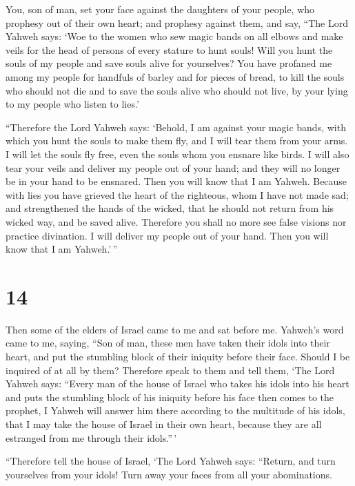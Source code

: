  You, son of man, set your face against the daughters of
your people, who prophesy out of their own heart; and prophesy against
them,  and say, ``The Lord Yahweh says: `Woe to the women
who sew magic bands on all elbows and make veils for the head of persons
of every stature to hunt souls! Will you hunt the souls of my people and
save souls alive for yourselves?  You have profaned me
among my people for handfuls of barley and for pieces of bread, to kill
the souls who should not die and to save the souls alive who should not
live, by your lying to my people who listen to lies.'

 ``Therefore the Lord Yahweh says: `Behold, I am against
your magic bands, with which you hunt the souls to make them fly, and I
will tear them from your arms. I will let the souls fly free, even the
souls whom you ensnare like birds.  I will also tear your
veils and deliver my people out of your hand; and they will no longer be
in your hand to be ensnared. Then you will know that I am Yahweh.
 Because with lies you have grieved the heart of the
righteous, whom I have not made sad; and strengthened the hands of the
wicked, that he should not return from his wicked way, and be saved
alive.  Therefore you shall no more see false visions nor
practice divination. I will deliver my people out of your hand. Then you
will know that I am Yahweh.'\,''

\hypertarget{section-12}{%
\section{14}\label{section-12}}

 Then some of the elders of Israel came to me and sat before
me.  Yahweh's word came to me, saying,  ``Son of
man, these men have taken their idols into their heart, and put the
stumbling block of their iniquity before their face. Should I be
inquired of at all by them?  Therefore speak to them and
tell them, `The Lord Yahweh says: ``Every man of the house of Israel who
takes his idols into his heart and puts the stumbling block of his
iniquity before his face then comes to the prophet, I Yahweh will answer
him there according to the multitude of his idols,  that I
may take the house of Israel in their own heart, because they are all
estranged from me through their idols.''\,'

 ``Therefore tell the house of Israel, `The Lord Yahweh
says: ``Return, and turn yourselves from your idols! Turn away your
faces from all your abominations.

